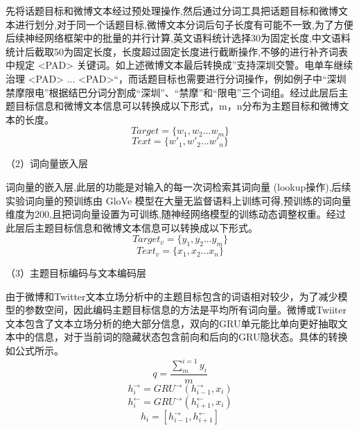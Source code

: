 先将话题目标和微博文本经过预处理操作,然后通过分词工具把话题目标和微博文本进行划分,对于同一个话题目标,微博文本分词后句子长度有可能不一致,为了方便后续神经网络框架中的批量的并行计算,英文语料统计选择30为固定长度,中文语料统计后截取50为固定长度，长度超过固定长度进行截断操作,不够的进行补齐词表中规定 <PAD> 关键词。如上述微博文本最后转换成”支持深圳交警。电单车继续治理 <PAD> ... <PAD>“，而话题目标也需要进行分词操作，例如例子中“深圳禁摩限电”根据结巴分词分割成“深圳”、“禁摩”和“限电”三个词组。经过此层后主题目标信息和微博文本信息可以转换成以下形式，m，n分布为主题目标和微博文本的长度。
\begin{equation}\label{target_info} Target= \lbrace w_1,w_2...w_m\rbrace \end{equation}
\begin{equation}\label{text_info} Text=\lbrace w'_1,w'_2...w'_n\rbrace  \end{equation}

（2）词向量嵌入层

词向量的嵌入层,此层的功能是对输入的每一次词检索其词向量 (lookup操作),后续实验词向量的预训练由 GloVe 模型在大量无监督语料上训练可得,预训练的词向量维度为200,且把词向量设置为可训练,随神经网络模型的训练动态调整权重。经过此层后主题目标信息和微博文本信息可以转换成以下形式。
\begin{equation}\label{target_info} Target_v= \lbrace y_1,y_2...y_m\rbrace \end{equation}
\begin{equation}\label{text_info} Text_v=\lbrace x_1,x_2...x_n\rbrace \end{equation}

（3）主题目标编码与文本编码层

由于微博和Twitter文本立场分析中的主题目标包含的词语相对较少，为了减少模型的参数空间，因此编码主题目标信息的方法是平均所有词向量。微博或Twiiter文本包含了文本立场分析的绝大部分信息，双向的GRU单元能比单向更好抽取文本中的信息，对于当前词的隐藏状态包含前向和后向的GRU隐状态。具体的转换如公式所示。
\begin{equation}\label{target_info} q=\frac{\sum_{m}^{i=1}y_i}{m} \end{equation}
\begin{equation}\label{target_info} h^→_i = GRU^→(h^→_{i-1}, x_i) \end{equation}
\begin{equation}\label{text_info}  h^←_i = GRU^→(h^←_{i+1}, x_i) \end{equation}
\begin{equation}\label{text_info}  h_i = [h^→_{i-1}, h^←_{i+1}] \end{equation}

